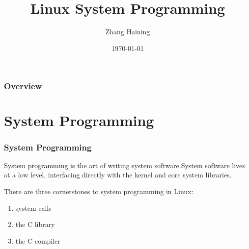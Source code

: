 \documentclass{beamer}
\title[Linux System Programming]{Linux System Programming} %
\author{Zhang Haining} %
\institute[cs.gzu] %
{
Guizhou University \\ %
\medskip
\textit{hnzhang1@gzu.edu.cn} %
}
\date{\today} %
\begin{document}
\begin{frame}
\titlepage %
\end{frame}

\begin{frame}
\frametitle{Overview} %
\tableofcontents %
\end{frame}


\section{System Programming} %
\begin{frame}
\frametitle{System Programming}
System programming is the art of writing system software.System software lives at a low level, interfacing directly with the kernel and core system libraries.

There are three cornerstones to system programming in Linux: 
\begin{enumerate}
\item system calls
\item the C library
\item the C compiler
\end{enumerate} 
\end{frame}
\end{document}

